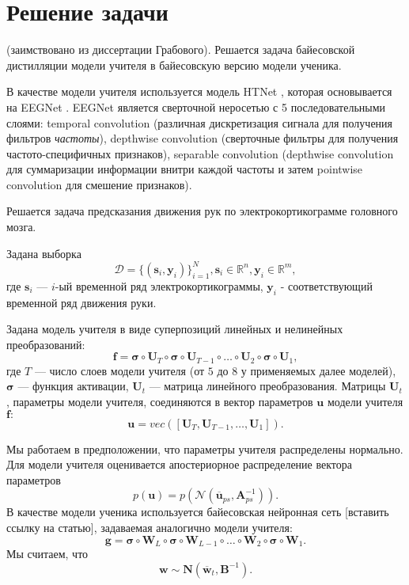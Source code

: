 \documentclass[12pt, twoside]{article}
\begin{document}
\section{Решение задачи}
(заимствовано из диссертации Грабового).
Решается задача байесовской дистилляции модели учителя в байесовскую версию модели ученика.

В качестве модели учителя используется модель HTNet \citep{peterson2021generalized}, которая основывается на EEGNet \citep{lawhern2018eegnet}. EEGNet является сверточной неросетью с 5 последовательными слоями: temporal convolution (различная дискретизация сигнала для получения фильтров \textit{частоты}), depthwise convolution (сверточные фильтры для получения частото-специфичных признаков), separable convolution (depthwise convolution для суммаризации информации внитри каждой частоты и затем pointwise convolution для смешение признаков).

Решается задача предсказания движения рук по электрокортикограмме головного мозга.


Задана выборка \[\mathcal{D} = \{(\mathbf{s}_i, \mathbf{y}_i)\}_{i=1}^N, \mathbf{s}_i \in \mathbb{R}^n, \mathbf{y}_i \in \mathbb{R}^m,\] где $\mathbf{s}_i$ --- $i$-ый временной ряд электрокортикограммы, $\mathbf{y}_i$ - соответствующий временной ряд движения руки.

Задана модель учителя в виде суперпозиций линейных и нелинейных преобразований: \[ 
\mathbf{f} = \mathbf{\sigma} \circ \mathbf{U}_T \circ \mathbf{\sigma} \circ \mathbf{U}_{T-1} \circ \dots \circ \mathbf{U}_2 \circ \mathbf{\sigma} \circ \mathbf{U}_1,
\] где $T$ --- число слоев модели учителя (от $5$ до $8$ у применяемых далее моделей), $\mathbf{\sigma}$ --- функция активации, $\mathbf{U}_t$ --- матрица линейного преобразования. Матрицы $\mathbf{U}_t$, параметры модели учителя, соединяются в вектор параметров $\mathbf{u}$ модели учителя $\mathbf{f}:$ 
\[
\mathbf{u} = vec([\mathbf{U}_T, \mathbf{U}_{T-1}, \dots, \mathbf{U}_{1}]).
\]

Мы работаем в предположении, что параметры учителя распределены нормально.
Для модели учителя оценивается апостериорное распределение вектора параметров \[p(\mathbf{u}) = p(\mathcal{N}(\mathbf{\overline{u}}_{ps}, \mathbf{A}_{ps}^{-1})).\]
В качестве модели ученика используется байесовская нейронная сеть [вставить ссылку на статью], задаваемая аналогично модели учителя:
\[
\mathbf{g} = \mathbf{\sigma} \circ \mathbf{W}_L \circ \mathbf{\sigma} \circ \mathbf{W}_{L-1} \circ \dots \circ \mathbf{W}_2 \circ \mathbf{\sigma} \circ \mathbf{W}_1.
\]
Мы считаем, что \[\mathbf{w} \sim \mathbf{N}(\mathbf{\overline{w}}_t, \mathbf{B}^{-1}).\] 
\end{document}
